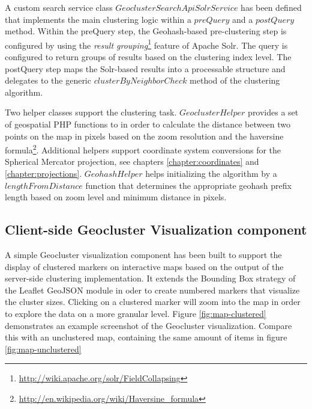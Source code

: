 \begin{itemize}
A custom search service class $GeoclusterSearchApiSolrService$ has been defined that implements the main clustering logic within a $preQuery$ and a $postQuery$ method. Within the preQuery step, the Geohash-based pre-clustering step is configured by using the \textit{result grouping}\footnote{\url{http://wiki.apache.org/solr/FieldCollapsing}} feature of Apache Solr. The query is configured to return groups of results based on the clustering index level. The postQuery step maps the Solr-based results into a processable structure and delegates to the generic $clusterByNeighborCheck$ method of the clustering algorithm.

\end{itemize}

Two helper classes support the clustering task. $GeoclusterHelper$ provides a set of geospatial PHP functions to in order to calculate the distance between two points on the map in pixels based on the zoom resolution and the haversine formula\footnote{\url{http://en.wikipedia.org/wiki/Haversine_formula}}. Additional helpers support coordinate system conversions for the Spherical Mercator projection, see chapters \ref{chapter:coordinates} and \ref{chapter:projections}. $GeohashHelper$ helps initializing the algorithm by a $lengthFromDistance$ function that determines the appropriate geohash prefix length based on zoom level and minimum distance in pixels.


\subsection{Client-side Geocluster Visualization component}

A simple Geocluster visualization component has been built to support the display of clustered markers on interactive maps based on the output of the server-side clustering implementation. It extends the Bounding Box strategy of the Leaflet GeoJSON module in oder to create numbered markers that visualize the cluster sizes. Clicking on a clustered marker will zoom into the map in order to explore the data on a more granular level. Figure \ref{fig:map-clustered} demonstrates an example screenshot of the Geocluster visualization. Compare this with an unclustered map, containing the same amount of items in figure \ref{fig:map-unclustered}

